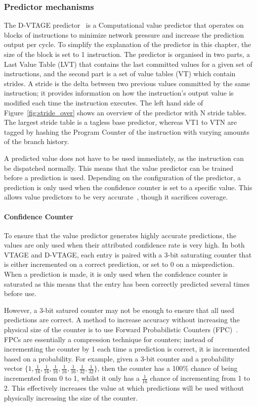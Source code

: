 \subsubsection{Predictor mechanisms}
The D-VTAGE predictor~\cite{peraisBeBop2015} is a Computational value predictor that operates on blocks of instructions to minimize network pressure and increase the prediction output per cycle.
To simplify the explanation of the predictor in this chapter, the size of the block is set to 1 instruction.
The predictor is organised in two parts, a Last Value Table (LVT) that contains the last committed values for a given set of instructions, and the second part is a set of value tables (VT) which contain strides.
A stride is the delta between two previous values committed by the same instruction; it provides information on how the instruction's output value is modified each time the instruction executes.
The left hand side of Figure~\ref{fig:stride_over} shows an overview of the predictor with N stride tables.
The largest stride table is a tagless base predictor, whereas VT1 to VTN are tagged by hashing the Program Counter of the instruction with varying amounts of the branch history.

A predicted value does not have to be used immediately, as the instruction can be dispatched normally.
This means that the value predictor can be trained before a prediction is used.
Depending on the configuration of the predictor, a prediction is only used when the confidence counter is set to a specific value.
This allows value predictors to be very accurate~\cite{peraisVTAGE2014}, though it sacrifices coverage.

\paragraph*{Confidence Counter}
To ensure that the value predictor generates highly accurate predictions, the values are only used when their attributed confidence rate is very high.
In both VTAGE and D-VTAGE, each entry is paired with a 3-bit saturating counter that is either incremented on a correct prediction, or set to 0 on a misprediction.
When a prediction is made, it is only used when the  confidence counter is saturated as this means that the entry has been correctly predicted several times before use.

However, a 3-bit satured counter may not be enough to ensure that all used predictions are correct.
A method to increase accuracy without increasing the physical size of the counter is to use Forward Probabilistic Counters (FPC)~\cite{riley2006fpc}.
FPCs are essentially a compression technique for counters; instead of incrementing the counter by 1 each time a prediction is correct, it is incremented based on a probability.
For example, given a 3-bit counter and a probability vector  $\{1,\frac{1}{16},\frac{1}{16},\frac{1}{16},\frac{1}{16},\frac{1}{16},\frac{1}{32},\frac{1}{32}\}$, then the counter has a 100\% chance of being incremented from 0 to 1, whilst it only has a $\frac{1}{16}$ chance of incrementing from 1 to 2.
This effectively increases the value at which predictions will be used without physically increasing the size of the counter. 

